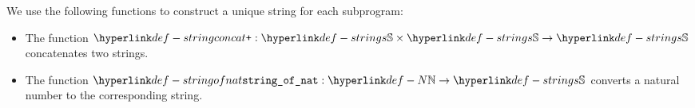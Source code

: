 We use the following functions to construct a unique string for each subprogram:
\begin{itemize}
\hypertarget{def-stringconcat}{}
\item The function $\stringconcat : \Strings \times \Strings \rightarrow \Strings$
concatenates two strings.

\hypertarget{def-stringofnat}{}
\item The function $\stringofint : \N \rightarrow \Strings$ converts a natural number
to the corresponding string.
\end{itemize}

\begin{mathpar}
\end{mathpar}

\begin{mathpar}
\end{mathpar}


